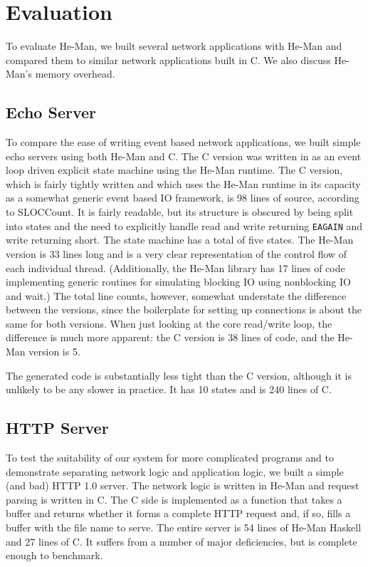 \documentclass[preprint]{sigplanconf}
\renewcommand{\t}{\texttt}
\begin{document}
\section{Evaluation}\label{sec:evaluation}

To evaluate He-Man, we built several network applications with He-Man
and compared them to similar network applications built in C.  We also
discuss He-Man's memory overhead.

\subsection{Echo Server}

To compare the ease of writing event based network applications, we
built simple echo servers using both He-Man and C. The C version was
written in as an event loop driven explicit state machine using the
He-Man runtime. The C version, which is fairly tightly written and
which uses the He-Man runtime in its capacity as a somewhat generic
event based IO framework, is 98 lines of source, according to
SLOCCount. It is fairly readable, but its structure is obscured by
being split into states and the need to explicitly handle read and
write returning \t{EAGAIN} and write returning short. The state
machine has a total of five states. The He-Man version is 33 lines
long and is a very clear representation of the control flow of each
individual thread. (Additionally, the He-Man library has 17 lines of
code implementing generic routines for simulating blocking IO using
nonblocking IO and wait.) The total line counts, however, somewhat
understate the difference between the versions, since the boilerplate
for setting up connections is about the same for both versions. When
just looking at the core read/write loop, the difference is much more
apparent: the C version is 38 lines of code, and the He-Man version is
5.

The generated code is substantially less tight than the C version,
although it is unlikely to be any slower in practice. It has 10 states
and is 240 lines of C.

\subsection{HTTP Server}

To test the suitability of our system for more complicated programs
and to demonstrate separating network logic and application logic, we
built a simple (and bad) HTTP 1.0 server. The network logic is written
in He-Man and request parsing is written in C. The C side is
implemented as a function that takes a buffer and returns whether it
forms a complete HTTP request and, if so, fills a buffer with the
file name to serve. The entire server is 54 lines of He-Man Haskell and
27 lines of C. It suffers from a number of major deficiencies, but is
complete enough to benchmark.
\end{document}
